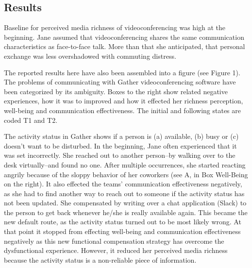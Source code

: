 \documentclass[man]{apa7}
\begin{document}
\subsection{Results}

Baseline for perceived media richness of videoconferencing was high at the beginning. Jane assumed that videoconferencing shares the same communication characteristics as face-to-face talk. More than that she anticipated, that personal exchange was less overshadowed with commuting distress.

The reported results here have also been assembled into a figure (see Figure 1). The problems of communicating with Gather videoconferencing software have been categorized by its ambiguity. Boxes to the right show related negative experiences, how it was to improved and how it effected her richness perception, well-being and communication effectiveness. The initial and following states are coded T1 and T2.

The activity status in Gather shows if a person is (a) available, (b) busy or (c) doesn't want to be disturbed. In the beginning, Jane often experienced that it was set incorrectly. She reached out to another person–by walking over to the desk virtually–and found no one. After multiple occurrences, she started reacting angrily because of the sloppy behavior of her coworkers (see A, in Box Well-Being on the right). It also effected the teams' communication effectiveness negatively, as she had to find another way to reach out to someone if the activity status has not been updated. She compensated by writing over a chat application (Slack) to the person to get back whenever he/she is really available again. This became the new default route, as the activity status turned out to be most likely wrong. At that point it stopped from effecting well-being and communication effectiveness negatively as this new functional compensation strategy has overcome the dysfunctional experience. However, it reduced her perceived media richness because the activity status is a non-reliable piece of information. 
\end{document}
